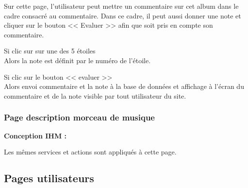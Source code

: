 
			\begin{paragraphe}
				Sur cette page, l'utilisateur peut mettre un commentaire sur cet album dans le cadre consacré au commentaire. Dans ce cadre, il peut aussi donner une note et cliquer sur le bouton << Evaluer >> afin que soit pris en compte son commentaire.
			\end{paragraphe}

			\begin{paragraphe}
				Si clic sur sur une des 5 étoiles \\
				Alors la note est définit par le numéro de l'étoile.
			\end{paragraphe}

			\begin{paragraphe}
				Si clic sur le bouton << evaluer >> \\
				Alors envoi commentaire et la note à la base de données et affichage à l'écran du commentaire et de la note visible par tout utilisateur du site.
			\end{paragraphe}


	\clearpage

		\subsubsection{Page description morceau de musique}

			\begin{paragraphe}
				\textbf{Conception IHM :}
			\end{paragraphe}

			\begin{paragraphe}
				Les mêmes services et actions sont appliqués à cette page.
			\end{paragraphe}



	\clearpage

	\subsection{Pages utilisateurs}
